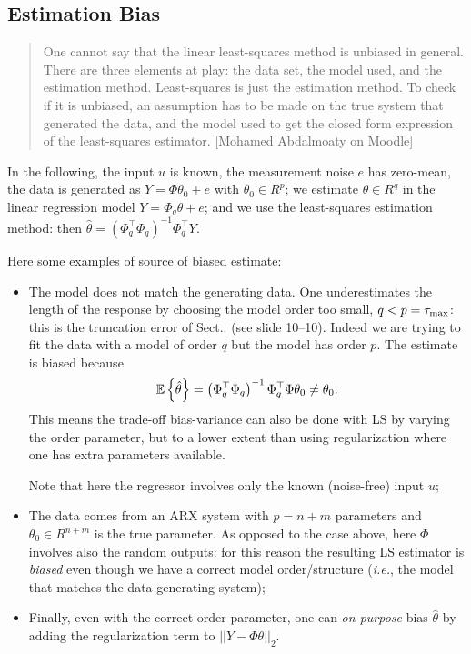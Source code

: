 \subsection{Estimation Bias}
\label{sec:estimation-bias}

\begin{quotation}
  One cannot say that the linear least-squares method is unbiased in general. There are three elements at play: the data set, the model used, and the estimation method. Least-squares is just the estimation method. To check if it is unbiased, an assumption has to be made on the true system that generated the data, and the model used to get the closed form expression of the least-squares estimator. [Mohamed Abdalmoaty on Moodle]
\end{quotation}

In the following, the input $u$ is known, the measurement noise $e$ has zero-mean, the data is generated as $Y=\Phi\theta_0+e$ with $\theta_0\in R^p$; we estimate $\theta\in R^q$ in the linear regression model $Y=\Phi_q\theta+e$; and we use the least-squares estimation method: then $\hat{\theta} = \left(\Phi_q^\top \Phi_q\right)^{-1} \Phi_q^\top Y$.

Here some examples of source of biased estimate:
\begin{itemize}
\item The model does not match the generating data. One underestimates the length of the response by choosing the model order too small, $q<p=\tau_\text{max}$: this is the truncation error of Sect.. (see slide 10--10). Indeed we are trying to fit the data with a model of order $q$ but the model has order $p$. The estimate is biased because
  \begin{equation*}
    \mathbb{E}\left\{\hat{\theta}\right\} = \left(\Phi_q^\top \Phi_q\right)^{-1}\Phi_q^\top\Phi \theta_0 \neq \theta_0.
  \end{equation*}
  This means the trade-off bias-variance can also be done with LS by varying the order parameter, but to a lower extent than using regularization where one has extra parameters available.

  Note that here the regressor involves only the known (noise-free) input $u$;
\item The data comes from an ARX system with $p=n+m$ parameters and $\theta_0\in R^{n+m}$ is the true parameter. As opposed to the case above, here $\Phi$ involves also the random outputs: for this reason the resulting LS estimator is \emph{biased} even though we have a correct model order/structure (\textit{i.e.}, the model that matches the data generating system);
\item Finally, even with the correct order parameter, one can \emph{on purpose} bias $\hat{\theta}$ by adding the regularization term to $||Y-\Phi\theta||_2$.
\end{itemize}

